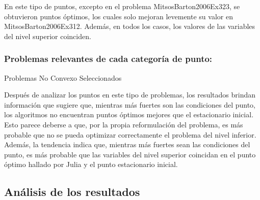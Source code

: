  En este tipo de puntos, excepto en el problema MitsosBarton2006Ex323,
 se obtuvieron puntos óptimos, 
 los cuales solo mejoran levemente su valor en MitsosBarton2006Ex312. 
 Además, en todos los casos, los valores de las variables del nivel superior coinciden.
     

\subsubsection{Problemas relevantes de cada categoría de punto:}
\begin{resultstable}{Problemas No Convexo Seleccionados}
    \end{resultstable}
    Después de analizar los puntos en este tipo de problemas, los resultados brindan información que sugiere que, mientras más fuertes son las condiciones del punto, los algoritmos no encuentran puntos óptimos mejores que el estacionario inicial. Esto parece deberse a que, por la propia reformulación del problema, es más probable que no se pueda optimizar correctamente el problema del nivel inferior. Además, la tendencia indica que, mientras más fuertes sean las condiciones del punto, es más probable que las variables del nivel superior coincidan en el punto óptimo hallado por Julia y el punto estacionario inicial.


\subsection{Análisis de los resultados}



